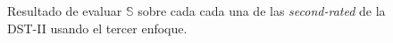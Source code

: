 \begin{figure}
	\centering
	\caption{Resultado de evaluar $\mathbb{S}$ sobre cada cada una de las \textit{second-rated} de la DST-II usando el tercer enfoque.} \label{fig:gaussian-example-approach3}
\end{figure}

